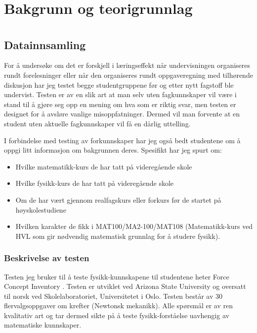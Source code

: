 \documentclass[a4paper,norsk,12pt]{report}
\begin{document}
\chapter{Bakgrunn og teorigrunnlag}
\chapter{}
\section{Datainnsamling}
For å undersøke om det er forskjell i læringseffekt når undervisningen organiseres rundt forelesninger eller når den organiseres rundt oppgaveregning med tilhørende diskusjon har jeg testet begge studentgruppene før og etter nytt fagstoff ble undervist. Testen er av en slik art at man selv uten fagkunnskaper vil være i stand til å gjøre seg opp en mening om hva som er riktig svar, men testen er designet for å avsløre vanlige misoppfatninger. Dermed vil man forvente at en student uten aktuelle fagkunnskaper vil få en dårlig uttelling.

I forbindelse med testing av forkunnskaper har jeg også bedt studentene om å oppgi litt informasjon om bakgrunnen deres. Spesifikt har jeg spurt om:
\begin{itemize}
\item
	Hvilke matematikk-kurs de har tatt på videregående skole
\item
	Hvilke fysikk-kurs de har tatt på videregående skole
\item
	Om de har vært gjennom realfagskurs eller forkurs før de startet på høyskolestudiene
\item
	Hvilken karakter de fikk i MAT100/MA2-100/MAT108 (Matematikk-kurs ved HVL som gir nødvendig matematisk grunnlag for å studere fysikk).
\end{itemize}

\subsection{Beskrivelse av testen}
Testen jeg bruker til å teste fysikk-kunnskapene til studentene heter Force Concept Inventory \cite{1992FCI}. Testen er utviklet ved Arizona State University og oversatt til norsk ved Skolelaboratoriet, Universitetet i Oslo. Testen består av 30 flervalgsoppgaver om krefter (Newtonsk mekanikk). Alle spørsmål er av ren kvalitativ art og tar dermed sikte på å teste fysikk-forståelse uavhengig av matematiske kunnskaper. 
\end{document}
